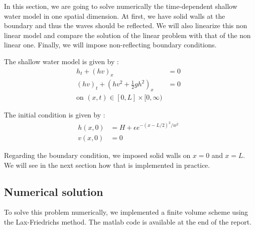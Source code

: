 In this section, we are going to solve numerically the time-dependent shallow water model in one spatial dimension. At first, we have solid walls at the boundary and thus the waves should be reflected. We will also linearize this non linear model and compare the solution of the linear problem with that of the non linear one. Finally, we will impose non-reflecting boundary conditions.

The shallow water model is given by :
\begin{align*}
h_t+(hv)_x &= 0\\
(hv)_t + (hv^2+\frac{1}{2}gh^2)_x &= 0\\
\text{on }(x,t)\in [0,L]\times [0,\infty)
\end{align*}

The initial condition is given by :
\begin{align*}
h(x,0) &= H+\epsilon e^{-(x-L/2)^2/w^2}\\
v(x,0) &= 0
\end{align*}

Regarding the boundary condition, we imposed solid walls on $x=0$ and $x=L$. We will see in the next section how that is implemented in practice.

\subsection{Numerical solution}
To solve this problem numerically, we implemented a finite volume scheme using the Lax-Friedrichs method. The matlab code is available at the end of the report.












